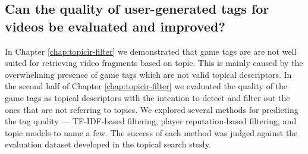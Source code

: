 
\subsection{Can the quality of user-generated tags for videos be evaluated and improved?}
In Chapter \ref{chap:topicir-filter} we demonstrated that game tags are are not well suited for retrieving video fragments based on topic. This is mainly caused by the overwhelming presence of game tags which are not valid topical descriptors. In the second half of Chapter \ref{chap:topicir-filter} we evaluated the quality of the game tags as topical descriptors with the intention to detect and filter out the ones that are not referring to topics. We explored several methods for predicting the tag quality --- TF-IDF-based filtering, player reputation-based filtering, and topic models to name a few. The success of each method was judged against the evaluation dataset developed in the topical search study.

